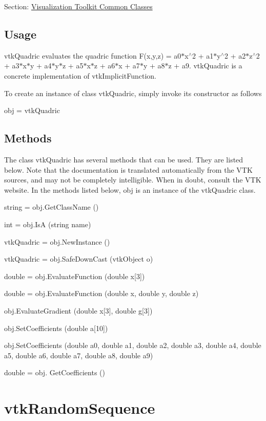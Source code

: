 Section\-: \hyperlink{sec_vtkcommon}{Visualization Toolkit Common Classes} \hypertarget{vtkwidgets_vtkxyplotwidget_Usage}{}\subsection{Usage}\label{vtkwidgets_vtkxyplotwidget_Usage}
vtk\-Quadric evaluates the quadric function F(x,y,z) = a0$\ast$x$^\wedge$2 + a1$\ast$y$^\wedge$2 + a2$\ast$z$^\wedge$2 + a3$\ast$x$\ast$y + a4$\ast$y$\ast$z + a5$\ast$x$\ast$z + a6$\ast$x + a7$\ast$y + a8$\ast$z + a9. vtk\-Quadric is a concrete implementation of vtk\-Implicit\-Function.

To create an instance of class vtk\-Quadric, simply invoke its constructor as follows \begin{DoxyVerb}  obj = vtkQuadric
\end{DoxyVerb}
 \hypertarget{vtkwidgets_vtkxyplotwidget_Methods}{}\subsection{Methods}\label{vtkwidgets_vtkxyplotwidget_Methods}
The class vtk\-Quadric has several methods that can be used. They are listed below. Note that the documentation is translated automatically from the V\-T\-K sources, and may not be completely intelligible. When in doubt, consult the V\-T\-K website. In the methods listed below, {\ttfamily obj} is an instance of the vtk\-Quadric class. 
\begin{DoxyItemize}
\item {\ttfamily string = obj.\-Get\-Class\-Name ()}  
\item {\ttfamily int = obj.\-Is\-A (string name)}  
\item {\ttfamily vtk\-Quadric = obj.\-New\-Instance ()}  
\item {\ttfamily vtk\-Quadric = obj.\-Safe\-Down\-Cast (vtk\-Object o)}  
\item {\ttfamily double = obj.\-Evaluate\-Function (double x\mbox{[}3\mbox{]})}  
\item {\ttfamily double = obj.\-Evaluate\-Function (double x, double y, double z)}  
\item {\ttfamily obj.\-Evaluate\-Gradient (double x\mbox{[}3\mbox{]}, double g\mbox{[}3\mbox{]})}  
\item {\ttfamily obj.\-Set\-Coefficients (double a\mbox{[}10\mbox{]})}  
\item {\ttfamily obj.\-Set\-Coefficients (double a0, double a1, double a2, double a3, double a4, double a5, double a6, double a7, double a8, double a9)}  
\item {\ttfamily double = obj. Get\-Coefficients ()}  
\end{DoxyItemize}\hypertarget{vtkcommon_vtkrandomsequence}{}\section{vtk\-Random\-Sequence}\label{vtkcommon_vtkrandomsequence}
